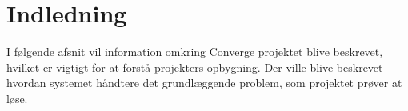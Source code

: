 \chapter{Indledning}

I følgende afsnit vil information omkring Converge projektet blive beskrevet, hvilket er vigtigt for at forstå projekters opbygning. Der ville blive beskrevet hvordan systemet håndtere det grundlæggende problem, som projektet prøver at løse.